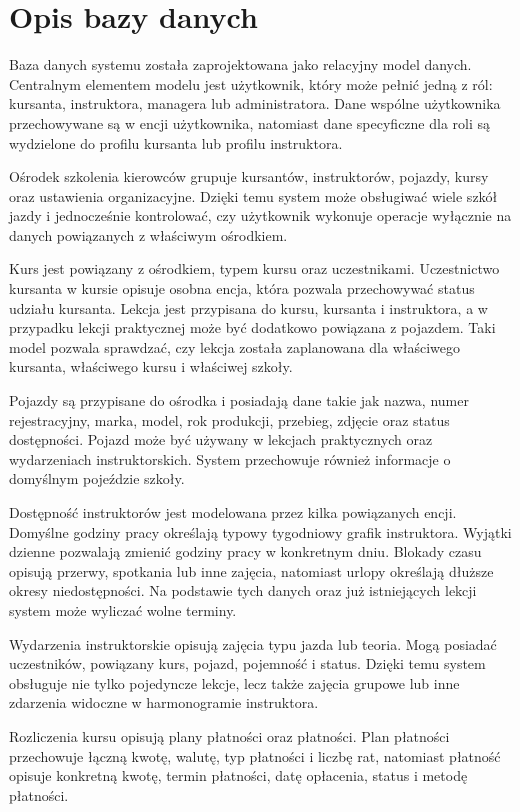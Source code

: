 \section{Opis bazy danych}
\label{sec:opis-bazy-danych}

Baza danych systemu została zaprojektowana jako relacyjny model danych. Centralnym elementem modelu jest użytkownik, który może pełnić jedną z ról: kursanta, instruktora, managera lub administratora. Dane wspólne użytkownika przechowywane są w encji użytkownika, natomiast dane specyficzne dla roli są wydzielone do profilu kursanta lub profilu instruktora.

Ośrodek szkolenia kierowców grupuje kursantów, instruktorów, pojazdy, kursy oraz ustawienia organizacyjne. Dzięki temu system może obsługiwać wiele szkół jazdy i jednocześnie kontrolować, czy użytkownik wykonuje operacje wyłącznie na danych powiązanych z właściwym ośrodkiem.

Kurs jest powiązany z ośrodkiem, typem kursu oraz uczestnikami. Uczestnictwo kursanta w kursie opisuje osobna encja, która pozwala przechowywać status udziału kursanta. Lekcja jest przypisana do kursu, kursanta i instruktora, a w przypadku lekcji praktycznej może być dodatkowo powiązana z pojazdem. Taki model pozwala sprawdzać, czy lekcja została zaplanowana dla właściwego kursanta, właściwego kursu i właściwej szkoły.

Pojazdy są przypisane do ośrodka i posiadają dane takie jak nazwa, numer rejestracyjny, marka, model, rok produkcji, przebieg, zdjęcie oraz status dostępności. Pojazd może być używany w lekcjach praktycznych oraz wydarzeniach instruktorskich. System przechowuje również informacje o domyślnym pojeździe szkoły.

Dostępność instruktorów jest modelowana przez kilka powiązanych encji. Domyślne godziny pracy określają typowy tygodniowy grafik instruktora. Wyjątki dzienne pozwalają zmienić godziny pracy w konkretnym dniu. Blokady czasu opisują przerwy, spotkania lub inne zajęcia, natomiast urlopy określają dłuższe okresy niedostępności. Na podstawie tych danych oraz już istniejących lekcji system może wyliczać wolne terminy.

Wydarzenia instruktorskie opisują zajęcia typu jazda lub teoria. Mogą posiadać uczestników, powiązany kurs, pojazd, pojemność i status. Dzięki temu system obsługuje nie tylko pojedyncze lekcje, lecz także zajęcia grupowe lub inne zdarzenia widoczne w harmonogramie instruktora.

Rozliczenia kursu opisują plany płatności oraz płatności. Plan płatności przechowuje łączną kwotę, walutę, typ płatności i liczbę rat, natomiast płatność opisuje konkretną kwotę, termin płatności, datę opłacenia, status i metodę płatności.

